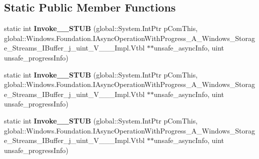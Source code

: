 \subsection*{Static Public Member Functions}
\begin{DoxyCompactItemize}
\item 
\mbox{\label{struct_windows_1_1_foundation_1_1_async_operation_progress_handler___a___windows___storage___stra482c68c8c7180278b02d484f8142a67_a09862371256026acb97f5974fedecea7}} 
static int {\bfseries Invoke\+\_\+\+\_\+\+S\+T\+UB} (global\+::\+System.\+Int\+Ptr p\+Com\+This, global\+::\+Windows.\+Foundation.\+I\+Async\+Operation\+With\+Progress\+\_\+\+A\+\_\+\+Windows\+\_\+\+Storage\+\_\+\+Streams\+\_\+\+I\+Buffer\+\_\+j\+\_\+uint\+\_\+\+V\+\_\+\+\_\+\+\_\+\+Impl.\+Vtbl $\ast$$\ast$unsafe\+\_\+async\+Info, uint unsafe\+\_\+progress\+Info)
\item 
\mbox{\label{struct_windows_1_1_foundation_1_1_async_operation_progress_handler___a___windows___storage___stra482c68c8c7180278b02d484f8142a67_a09862371256026acb97f5974fedecea7}} 
static int {\bfseries Invoke\+\_\+\+\_\+\+S\+T\+UB} (global\+::\+System.\+Int\+Ptr p\+Com\+This, global\+::\+Windows.\+Foundation.\+I\+Async\+Operation\+With\+Progress\+\_\+\+A\+\_\+\+Windows\+\_\+\+Storage\+\_\+\+Streams\+\_\+\+I\+Buffer\+\_\+j\+\_\+uint\+\_\+\+V\+\_\+\+\_\+\+\_\+\+Impl.\+Vtbl $\ast$$\ast$unsafe\+\_\+async\+Info, uint unsafe\+\_\+progress\+Info)
\item 
\mbox{\label{struct_windows_1_1_foundation_1_1_async_operation_progress_handler___a___windows___storage___stra482c68c8c7180278b02d484f8142a67_a09862371256026acb97f5974fedecea7}} 
static int {\bfseries Invoke\+\_\+\+\_\+\+S\+T\+UB} (global\+::\+System.\+Int\+Ptr p\+Com\+This, global\+::\+Windows.\+Foundation.\+I\+Async\+Operation\+With\+Progress\+\_\+\+A\+\_\+\+Windows\+\_\+\+Storage\+\_\+\+Streams\+\_\+\+I\+Buffer\+\_\+j\+\_\+uint\+\_\+\+V\+\_\+\+\_\+\+\_\+\+Impl.\+Vtbl $\ast$$\ast$unsafe\+\_\+async\+Info, uint unsafe\+\_\+progress\+Info)
\item 
$$
\end{DoxyCompactItemize}
